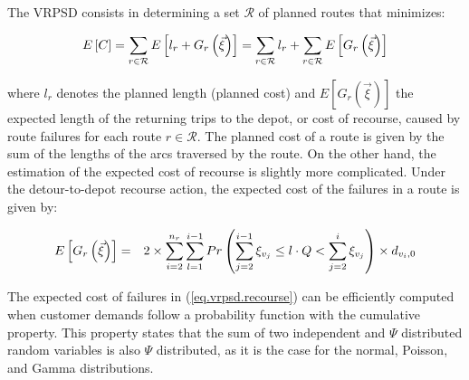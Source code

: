 The VRPSD consists in determining a set $\mathcal{R}$ of planned routes that minimizes:

\begin{equation}
\small
E\left[C\right]=\sum_{r\in \mathcal{R}}E\left[l_r+G_r\left(\vec{\xi}\right)\right]=\sum_{r\in \mathcal{R}}l_{r}+\sum_{r\in\mathcal{R}}E\left[G_r\left(\vec{\xi}\right)\right]\label{eq.vrpsd.of}
\end{equation}

\noindent where $l_{r}$ denotes the planned length (planned cost) and $E\left[G_r\left(\vec{\xi}\right)\right]$ the expected length of the returning trips to the depot, or cost of recourse, caused by route failures for each route $r\in \mathcal{R}$. The planned cost of a route is given by the sum of the lengths of the arcs traversed by the route. On the other hand, the estimation of the expected cost of recourse is slightly more complicated. Under the detour-to-depot recourse action, the expected cost of the failures in a route is given by:

\begin{eqnarray}
\small
E\left[G_r\left(\vec{\xi}\right)\right]&=&2\times \sum_{i=2}^{n_{r}}\sum_{l=1}^{i-1}Pr\left(\sum_{j=2}^{i-1}\xi_{v_{j}}\leq l\cdot Q < \sum_{j=2}^{i}\xi_{v_{j}}\right)\times d_{v_{i},0}
\label{eq.vrpsd.recourse}
\end{eqnarray}

The expected cost of failures in (\ref{eq.vrpsd.recourse}) can be efficiently computed when customer demands follow a probability function with the cumulative property. This property states that the sum of two independent and $\Psi$ distributed random variables is also $\Psi$ distributed, as it is the case for the normal, Poisson, and Gamma distributions.

